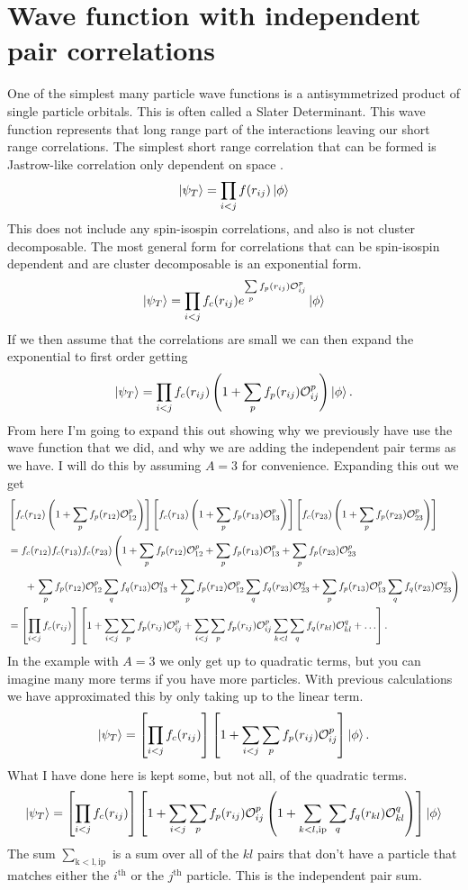 \section{Wave function with independent pair correlations}
One of the simplest many particle wave functions is a antisymmetrized product of single particle orbitals. This is often called a Slater Determinant. This wave function represents that long range part of the interactions leaving our short range correlations. The simplest short range correlation that can be formed is Jastrow-like correlation only dependent on space .
\begin{equation}
   \left| \psi_T \right> = \prod\limits_{i<j}f(r_{ij}) \left| \phi \right>
\end{equation}
This does not include any spin-isospin correlations, and also is not cluster decomposable. The most general form for correlations that can be spin-isospin dependent and are cluster decomposable is an exponential form.
\begin{equation}
   \left| \psi_T \right> = \prod\limits_{i<j}f_c(r_{ij}) e^{\sum\limits_pf_p(r_{ij})\mathcal{O}_{ij}^p} \left| \phi \right>
\end{equation}
If we then assume that the correlations are small we can then expand the exponential to first order getting
\begin{equation}
   \left| \psi_T \right> = \prod\limits_{i<j}f_c(r_{ij}) \left(1+\sum\limits_pf_p(r_{ij})\mathcal{O}_{ij}^p\right) \left| \phi \right>.
\end{equation}
From here I'm going to expand this out showing why we previously have use the wave function that we did, and why we are adding the independent pair terms as we have. I will do this by assuming $A=3$ for convenience. Expanding this out we get
\begin{align}
   &\left[f_{c}(r_{12})\left(1+\sum\limits_{p} f_{p}(r_{12})\mathcal{O}_{12}^{p}\right)\right]\left[f_{c}(r_{13})\left(1+\sum\limits_{p} f_{p}(r_{13})\mathcal{O}_{13}^{p}\right)\right]\left[f_{c}(r_{23})\left(1+\sum\limits_{p} f_{p}(r_{23})\mathcal{O}_{23}^{p}\right)\right] \\
   &=f_{c}(r_{12})f_{c}(r_{13})f_{c}(r_{23})\left(1+\sum\limits_{p} f_{p}(r_{12})\mathcal{O}_{12}^{p}+\sum\limits_{p} f_{p}(r_{13})\mathcal{O}_{13}^{p}+\sum\limits_{p} f_{p}(r_{23})\mathcal{O}_{23}^{p}\right. \\
   &~~~~~+\left.\sum\limits_{p} f_{p}(r_{12})\mathcal{O}_{12}^{p}\sum\limits_{q} f_{q}(r_{13})\mathcal{O}_{13}^{q}+\sum\limits_{p} f_{p}(r_{12})\mathcal{O}_{12}^{p}\sum\limits_{q} f_{q}(r_{23})\mathcal{O}_{23}^{q}+\sum\limits_{p} f_{p}(r_{13})\mathcal{O}_{13}^{p}\sum\limits_{q} f_{q}(r_{23})\mathcal{O}_{23}^{q}\right) \\
   &= \left[\prod\limits_{i<j}f_{c}(r_{ij})\right]\left[1+\sum\limits_{i<j}\sum\limits_p f_p(r_{ij})\mathcal{O}_{ij}^p+\sum\limits_{i<j}\sum\limits_p f_p(r_{ij})\mathcal{O}_{ij}^p\sum\limits_{k<l}\sum\limits_q f_q(r_{kl})\mathcal{O}_{kl}^q + \ldots \right].
\end{align}
In the example with $A=3$ we only get up to quadratic terms, but you can imagine many more terms if you have more particles. With previous calculations we have approximated this by only taking up to the linear term.
\begin{equation}
   \left| \psi_T \right> = \left[\prod\limits_{i<j}f_c(r_{ij})\right] \left[1+\sum\limits_{i<j}\sum\limits_p f_p(r_{ij})\mathcal{O}_{ij}^p\right] \left| \phi \right>.
\end{equation}
What I have done here is kept some, but not all, of the quadratic terms.
\begin{equation}
   \left| \psi_T \right> = \left[\prod\limits_{i<j}f_c(r_{ij})\right] \left[1+\sum\limits_{i<j}\sum\limits_p f_p(r_{ij})\mathcal{O}_{ij}^p\left(1 + \sum\limits_{k<l,\mathrm{ip}}\sum\limits_q f_q(r_{kl})\mathcal{O}_{kl}^q\right)\right] \left| \phi \right>
\end{equation}
The sum $\sum\limits_{\mathrm{k<l,ip}}$ is a sum over all of the $kl$ pairs that don't have a particle that matches either the $i^\mathrm{th}$ or the $j^\mathrm{th}$ particle. This is the independent pair sum.

